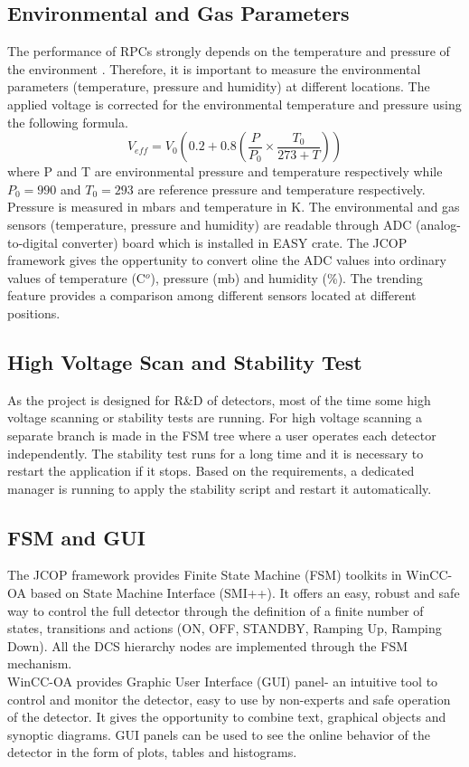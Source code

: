 \documentclass[a4paper,11pt]{article}
\begin{document}
\subsection{Environmental and Gas Parameters}
The performance of RPCs strongly depends on the temperature and pressure of the environment \cite{env-rpc}. Therefore, it is important to measure the environmental parameters (temperature, pressure and humidity) at different locations. The applied voltage is corrected for the environmental temperature and pressure using the
following formula.
\begin{equation*}\label{veff}
V_{eff} = V_{0} ( 0.2 + 0.8 (\frac{P}{P_{0}} \times \frac{T_{0}}{273+T}))
\end{equation*}
where P and T are environmental pressure and temperature respectively while $P_{0} = 990$ and $T_{0} = 293$ are reference pressure and temperature respectively. Pressure is measured in mbars and temperature in K. The environmental and gas sensors (temperature, pressure and humidity) are readable through ADC (analog-to-digital converter) board which is installed in EASY crate. The JCOP framework gives the oppertunity to convert oline the ADC values into ordinary values of temperature (C$^o$), pressure (mb) and humidity (\%). The trending feature provides a comparison among different sensors located at different positions.

\subsection{High Voltage Scan and Stability Test}
As the project is designed for R\&D of detectors, most of the time some high voltage scanning or stability tests are running. For high voltage scanning a separate branch is made in the FSM tree where a user operates each detector independently. The stability test runs for a long time and it is necessary to restart the application if it stops. Based on the requirements, a dedicated manager is running to apply the stability script and restart it automatically.    
\subsection{FSM and GUI} 
The JCOP framework provides Finite State Machine (FSM) toolkits in WinCC-OA based on State Machine Interface (SMI++). It offers an easy, robust and safe way to control the full detector through the definition of a finite number of states, transitions and actions (ON, OFF, STANDBY, Ramping Up, Ramping Down). All the DCS hierarchy nodes are implemented through the FSM mechanism.\\
WinCC-OA provides Graphic User Interface (GUI) panel- an intuitive tool to control and monitor the detector, easy to use by non-experts and safe operation of the detector. It gives the opportunity to combine text, graphical objects and synoptic diagrams. GUI panels can be used to see the online behavior of the detector in the form of plots, tables and histograms. 
\end{document}
